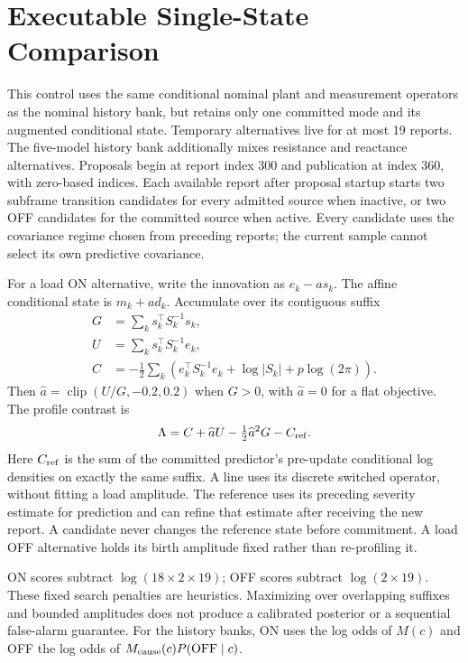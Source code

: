 \section{Executable Single-State Comparison}
\label{app:single-state}

This control uses the same conditional nominal plant and measurement
operators as the nominal history bank, but retains only one committed mode and its
augmented conditional state. Temporary alternatives live for at most
19 reports. The five-model history bank additionally mixes resistance and
reactance alternatives. Proposals begin at report index 300 and publication
at index 360, with zero-based indices. Each available report after proposal
startup starts two subframe transition candidates
for every admitted source when inactive, or two OFF candidates for the
committed source when active. Every candidate uses the covariance regime
chosen from preceding reports; the current sample cannot select its own
predictive covariance.

For a load ON alternative, write the innovation as $e_k-a s_k$. The affine
conditional state is $m_k+a d_k$. Accumulate over its contiguous suffix
\begin{align}
 G&=\sum_k s_k^\top S_k^{-1}s_k,\\
 U&=\sum_k s_k^\top S_k^{-1}e_k,\\
 C&=-\frac12\sum_k\left(e_k^\top S_k^{-1}e_k
        +\log|S_k|+p\log(2\pi)\right).
\end{align}
Then $\widehat a=\operatorname{clip}(U/G,-0.2,0.2)$ when $G>0$, with
$\widehat a=0$ for a flat objective. The profile contrast is
\begin{equation}
 \Lambda=C+\widehat aU-\tfrac12\widehat a^2G-C_{\rm ref}.
\end{equation}
Here $C_{\rm ref}$ is the sum of the committed predictor's pre-update
conditional log densities on exactly the same suffix. A line uses its
discrete switched operator, without fitting a load amplitude. The reference
uses its preceding severity estimate for prediction and can refine that
estimate after receiving the new report. A candidate never changes the
reference state before commitment. A load OFF alternative holds its birth
amplitude fixed rather than re-profiling it.

ON scores subtract $\log(18\times2\times19)$; OFF scores subtract
$\log(2\times19)$. These fixed search penalties are heuristics. Maximizing
over overlapping suffixes and bounded amplitudes does not produce a
calibrated posterior or a sequential false-alarm guarantee. For the history
banks, ON uses the log odds of $M(c)$ and OFF the log odds of
$M_{\rm cause}(c)P({\rm OFF}\mid c)$.

